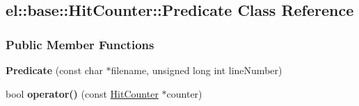 \hypertarget{a00070}{}\subsection{el\+:\+:base\+:\+:Hit\+Counter\+:\+:Predicate Class Reference}
\label{a00070}
\subsubsection*{Public Member Functions}
\begin{DoxyCompactItemize}
\item 
\hypertarget{a00070_ab35f4f7da40df5a788c3984d097bb38c}{}{\bfseries Predicate} (const char $\ast$filename, unsigned long int line\+Number)\label{a00070_ab35f4f7da40df5a788c3984d097bb38c}

\item 
\hypertarget{a00070_ae07b1562a3c0ed38457401e60b80b0c5}{}bool {\bfseries operator()} (const \hyperlink{a00036}{Hit\+Counter} $\ast$counter)\label{a00070_ae07b1562a3c0ed38457401e60b80b0c5}

\end{DoxyCompactItemize}
